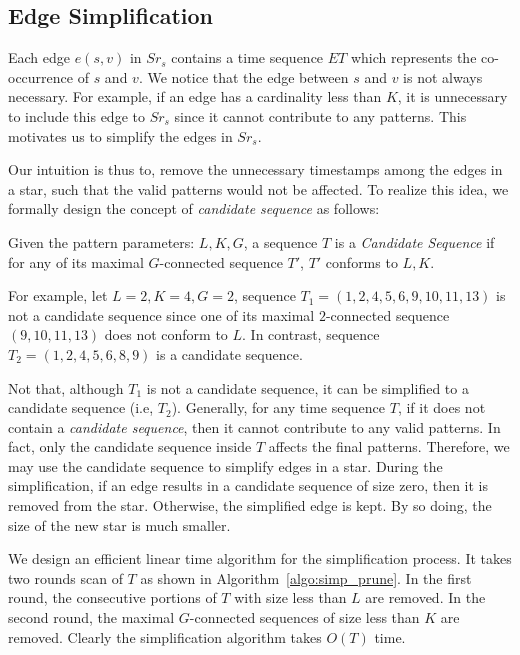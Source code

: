 \subsection{Edge Simplification}
Each edge $e(s,v)$ in $Sr_s$ contains a time sequence $ET$ 
which represents the co-occurrence of $s$ and $v$. We notice that the edge 
between $s$ and $v$ is not always necessary. For example, if an edge has a
cardinality less than $K$, it is unnecessary to include this edge to 
$Sr_s$ since it cannot contribute to any patterns.
This motivates us to simplify the edges in $Sr_s$.

Our intuition is thus to, remove the unnecessary timestamps among 
the edges in a star, such that the valid patterns
would not be affected. To realize this idea,
we formally design the concept of \emph{candidate sequence} as follows:

\begin{definition}
Given the pattern parameters: $L,K,G$, a sequence $T$ is a \emph{Candidate Sequence} 
if for any of its maximal $G$-connected sequence $T'$, $T'$ conforms to $L,K$. 
\end{definition}
For example, let $L = 2, K = 4, G = 2$, sequence $T_1=(1,2,4,5,6,9,10,11,13)$ is 
not a candidate sequence since one of its maximal $2$-connected sequence $(9,10,11,13)$
does not conform to $L$. In contrast, sequence $T_2=(1,2,4,5,6,8,9)$ is 
a candidate sequence.

Not that, although $T_1$ is not a candidate sequence, it can be simplified
to a candidate sequence (i.e, $T_2$). Generally, for any time sequence $T$, 
if it does not contain a \emph{candidate sequence}, then it cannot contribute
to any valid patterns. In fact, only the candidate sequence inside $T$ affects
the final patterns. Therefore, we may use the candidate sequence to simplify edges in 
a star. During the simplification, if an edge results in a candidate
sequence of size zero, then it is removed from the star. Otherwise,
the simplified edge is kept. By so doing, the size of the new star
is much smaller.

We design an efficient linear time algorithm for the simplification process.
It takes two rounds scan of $T$ as shown in Algorithm~\ref{algo:simp_prune}. 
In the first round, the consecutive portions of $T$ with size less than $L$ are removed.
In the second round, the maximal $G$-connected sequences of size less than $K$ are
removed. Clearly the simplification algorithm takes $O(T)$ time.


